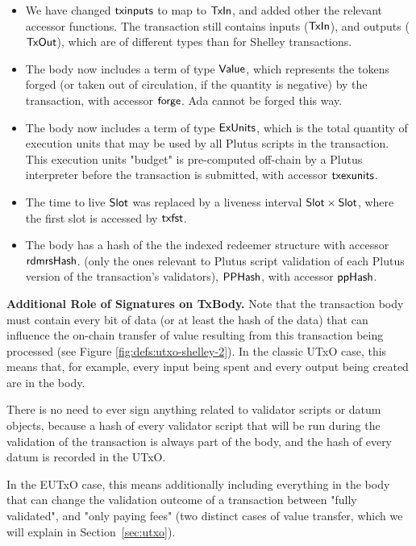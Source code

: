 \begin{itemize}

  \item We have changed $\mathsf{txinputs}$ to map to $\mathsf{TxIn}$, and added other the relevant
  accessor functions. The transaction still contains inputs ($\mathsf{TxIn}$), and
  outputs ($\mathsf{TxOut}$), which are of different types than for Shelley transactions.
  \item The body now includes a term of type $\mathsf{Value}$, which represents
  the tokens forged (or taken out of circulation, if the quantity is negative)
  by the transaction,
  with accessor $\mathsf{forge}$. Ada cannot be forged this way.
  \item The body now includes a term of type $\mathsf{ExUnits}$, which is the total quantity of execution units
  that may be used by all Plutus scripts in the transaction.
  This execution units "budget" is pre-computed off-chain by a Plutus interpreter
  before the transaction is submitted, with accessor $\mathsf{txexunits}$.
  \item The
  time to live $\mathsf{Slot}$ was replaced by a liveness interval $\mathsf{Slot} \times \mathsf{Slot}$,
  where the first slot is accessed by $\mathsf{txfst}$.
  \item The body has a hash of the the indexed redeemer structure
    with accessor $\mathsf{rdmrsHash}$.
  (only the ones relevant to Plutus script validation of each Plutus
  version of the transaction's validators), $\mathsf{PPHash}$, with accessor $\mathsf{ppHash}$.
\end{itemize}

\textbf{Additional Role of Signatures on TxBody.}
Note that the transaction body must contain every bit of data
(or at least the hash of the data) that can influence the
on-chain transfer of value resulting from this transaction being processed
(see Figure \ref{fig:defs:utxo-shelley-2}).
In the classic UTxO case, this means that, for example,
every input being spent and every output being created are in the body.

There is no need to ever sign anything related to validator scripts or datum objects,
because a hash of every validator script that will be run during the validation
of the transaction is always part of the body, and the hash of every datum
is recorded in the UTxO.

In the EUTxO case, this means additionally including everything in the body that can change
the validation outcome of a transaction between "fully validated", and "only
paying fees" (two distinct cases of value transfer, which
we will explain in Section~\ref{sec:utxo}).

